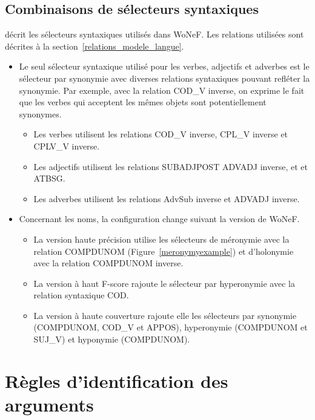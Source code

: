 \documentclass[oneside,parskip,draft]{scrbook}
\begin{document}
\subsection{Combinaisons de sélecteurs syntaxiques}

\cite[section 3.1.1.3]{mouton2010phd} décrit les sélecteurs syntaxiques
utilisés dans WoNeF. Les relations utilisées sont décrites à la
section~\ref{relations_modele_langue}.

\begin{itemize}
    \item Le seul sélecteur syntaxique utilisé pour les verbes, adjectifs et
        adverbes est le sélecteur par synonymie avec diverses relations
        syntaxiques pouvant refléter la synonymie. Par exemple, avec la
        relation COD\_V inverse, on exprime le fait que les verbes qui acceptent
        les mêmes objets sont potentiellement synonymes.
        \begin{itemize}
            \item Les verbes utilisent les relations COD\_V inverse, CPL\_V
                inverse et CPLV\_V inverse.
            \item Les adjectifs utilisent les relations SUBADJPOST ADVADJ
                inverse, et et ATBSG.
            \item Les adverbes utilisent les relations AdvSub inverse et ADVADJ
                inverse.
        \end{itemize}
    \item Concernant les noms, la configuration change suivant la version de WoNeF.
        \begin{itemize}
            \item La version haute précision utilise les sélecteurs de
                méronymie avec la relation COMPDUNOM
                (Figure~\ref{meronymyexample}) et d'holonymie avec la relation
                COMPDUNOM inverse.
            \item La version à haut F-score rajoute le sélecteur par
                hyperonymie avec la relation syntaxique COD.
            \item La version à haute couverture rajoute elle les sélecteurs
                par synonymie (COMPDUNOM, COD\_V et APPOS), hyperonymie
                (COMPDUNOM et SUJ\_V) et hyponymie (COMPDUNOM).
        \end{itemize}
\end{itemize}

\section{Règles d'identification des arguments}
\label{argument_identification}
\end{document}
